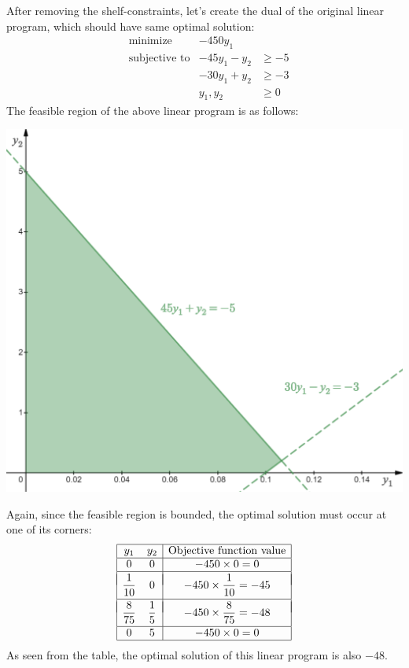 \documentclass{article}
\begin{document}
\begin{enumerate}
    After removing the shelf-constraints, let's create the dual of the original linear program, which should have same optimal solution:
    $$
      \begin{aligned}
         & \text{minimize}      & -450y_1                \\
         & \text{subjective to} & -45y_1 - y_2  & \ge -5 \\
         &                      & -30y_1  + y_2 & \ge -3 \\
         &                      & y_1, y_2      & \ge 0
      \end{aligned}
    $$
    The feasible region of the above linear program is as follows:
    \begin{center}
      \href{https://www.desmos.com/calculator/8gugxk2gyv}{\includegraphics[width=0.6667\linewidth]{images/q2c_1.png}}
    \end{center}
    Again, since the feasible region is bounded, the optimal solution must occur at one of its corners:
    $$
      \begin{array}{|cc|c|}
        \hline
        y_1           & y_2          & \text{Objective function value} \\
        \hline
        0             & 0            & -450 \times 0 = 0               \\
        \hline        &              &                                 \\[-10pt]
        \dfrac{1}{10} & 0            & -450 \times \dfrac{1}{10} = -45 \\[6pt]
        \hline        &              &                                 \\[-10pt]
        \dfrac{8}{75} & \dfrac{1}{5} & -450 \times \dfrac{8}{75} = -48 \\[6pt]
        \hline
        0             & 5            & -450 \times 0 = 0               \\
        \hline
      \end{array}
    $$
    As seen from the table, the optimal solution of this linear program is also $-48$.


\end{enumerate}
\end{document}
